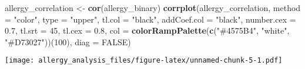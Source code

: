 \documentclass[
]{article}
\newenvironment{Shaded}{\begin{snugshade}}{\end{snugshade}}
\newcommand{\AttributeTok}[1]{\textcolor[rgb]{0.13,0.29,0.53}{#1}}
\newcommand{\ConstantTok}[1]{\textcolor[rgb]{0.56,0.35,0.01}{#1}}
\newcommand{\DecValTok}[1]{\textcolor[rgb]{0.00,0.00,0.81}{#1}}
\newcommand{\FloatTok}[1]{\textcolor[rgb]{0.00,0.00,0.81}{#1}}
\newcommand{\FunctionTok}[1]{\textcolor[rgb]{0.13,0.29,0.53}{\textbf{#1}}}
\newcommand{\NormalTok}[1]{#1}
\newcommand{\OtherTok}[1]{\textcolor[rgb]{0.56,0.35,0.01}{#1}}
\newcommand{\StringTok}[1]{\textcolor[rgb]{0.31,0.60,0.02}{#1}}
\begin{document}
\begin{Shaded}
\begin{Highlighting}[]
\NormalTok{allergy\_correlation }\OtherTok{\textless{}{-}} \FunctionTok{cor}\NormalTok{(allergy\_binary)}
\FunctionTok{corrplot}\NormalTok{(allergy\_correlation, }
         \AttributeTok{method =} \StringTok{"color"}\NormalTok{,}
         \AttributeTok{type =} \StringTok{"upper"}\NormalTok{,}
         \AttributeTok{tl.col =} \StringTok{"black"}\NormalTok{,}
         \AttributeTok{addCoef.col =} \StringTok{"black"}\NormalTok{,}
         \AttributeTok{number.cex =} \FloatTok{0.7}\NormalTok{,       }
         \AttributeTok{tl.srt =} \DecValTok{45}\NormalTok{,            }
         \AttributeTok{tl.cex =} \FloatTok{0.8}\NormalTok{,     }
         \AttributeTok{col =} \FunctionTok{colorRampPalette}\NormalTok{(}\FunctionTok{c}\NormalTok{(}\StringTok{"\#4575B4"}\NormalTok{, }\StringTok{"white"}\NormalTok{, }\StringTok{"\#D73027"}\NormalTok{))(}\DecValTok{100}\NormalTok{),  }
         \AttributeTok{diag =} \ConstantTok{FALSE}\NormalTok{)          }
\end{Highlighting}
\end{Shaded}

\texttt{[image: allergy\_analysis\_files/figure-latex/unnamed-chunk-5-1.pdf]}
\end{document}
